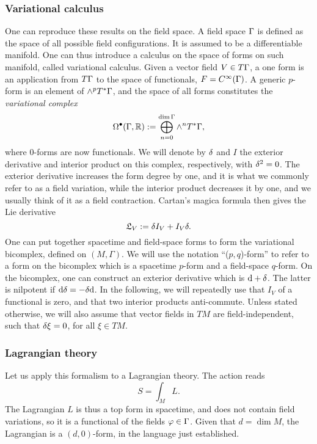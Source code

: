 \subsubsection*{Variational calculus}
One can reproduce these results on the field space. A field space $\Gamma $ is defined as the space of all possible field configurations. It is assumed to be a differentiable manifold. One can thus introduce a calculus on the space of forms on such manifold, called variational calculus. Given a vector field $V\in T\Gamma $, a one form is an application from $T\Gamma $ to the space of functionals, $F=C^\infty (\Gamma )$. A generic $p$-form is an element of $\wedge^pT^*\Gamma $, and the space of all forms constitutes the \textit{variational complex}
\begin{equation}
	\Omega^\bullet(\Gamma ,\mathbb{R}):=\bigoplus_{n=0}^{\dim \Gamma }\wedge^n T^*\Gamma ,
\end{equation}
where $0$-forms are now functionals. We will denote by $\delta$ and $I$ the exterior derivative and interior product on this complex, respectively, with $\delta^2=0$. The exterior derivative increases the form degree by one, and it is what we commonly refer to as a field variation, while the interior product decreases it by one, and we usually think of it as a field contraction. Cartan’s magica formula then gives the Lie derivative
\begin{equation}
	\mathfrak{L}_V:=\delta I_V+I_V\delta .
\end{equation}
One can put together spacetime and field-space forms to form the variational bicomplex, defined on $(M,\Gamma)$. We will use the notation “($p, q$)-form” to refer to a form on the bicomplex which is a spacetime $p$-form and a field-space $q$-form. On the bicomplex, one can construct an exterior derivative which is $\dd +\delta $. The latter is nilpotent if $\dd \delta=-\delta \dd $. In the following, we will repeatedly use that $I_V$ of a functional is zero, and that two interior products anti-commute. Unless stated otherwise, we will also assume that vector fields in $TM$ are field-independent, such that $\delta\xi=0$, for all $\xi\in TM$.

\subsubsection*{Lagrangian theory}
Let us apply this formalism to a Lagrangian theory. The action reads
\begin{equation}
	S=\int_ML.
\end{equation}
The Lagrangian $L$ is thus a top form in spacetime, and does not contain field variations, so it is a functional of the fields $\varphi\in \Gamma$. Given that $d=\dim M$, the Lagrangian is a $(d, 0)$-form, in the language just established.
 
 
 
 

 
 
 

 
 
 

 
 
 

 
 
 

 
 
 

 
 
 

 
 
 

 
 
 
